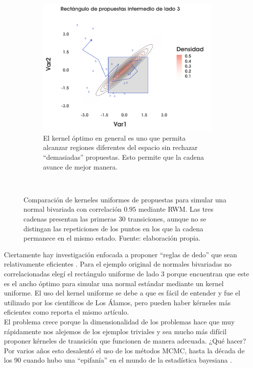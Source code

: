 \begin{figure}
\begin{subfigure}{0.35\textwidth}
    \end{subfigure}
     ~ 
    \begin{subfigure}{0.35\textwidth}
        \includegraphics[width=\textwidth]{Figs/Bayes/Ejemplo_RWM_Compara2}
        \caption{El kernel óptimo en general es uno que permita alcanzar regiones diferentes del espacio sin rechazar ``demasiadas'' propuestas. Esto permite que la cadena avance de mejor manera.}
    \end{subfigure}
    ~
    \caption{Comparación de kerneles uniformes de propuestas para simular una normal bivariada con correlación $0.95$ mediante RWM. Las tres cadenas presentan las primeras $30$ transiciones, aunque no se distingan las repeticiones de los puntos en los que la cadena permanece en el mismo estado. Fuente: elaboración propia.}\label{fig:RWM_Corr}
\end{figure}

Ciertamente hay investigación enfocada a proponer ``reglas de dedo'' que sean relativamente eficientes \parencites{GelmanRobertsGilks96,Geyer05,YangRdz13}. Para el ejemplo original de normales bivariadas no correlacionadas elegí el rectángulo uniforme de lado $3$ porque \textcite{YangRdz13} encuentran que este es el ancho óptimo para simular una normal estándar mediante un kernel uniforme. El uso del kernel uniforme se debe a que es fácil de entender y fue el utilizado por los científicos de Los Álamos, pero pueden haber kérneles más eficientes como reporta el mismo artículo.\\ 

 El problema crece porque la dimensionalidad de los problemas hace que muy rápidamente nos alejemos de los ejemplos triviales y sea mucho más difícil proponer kérneles de transición que funcionen de manera adecuada. ¿Qué hacer? Por varios años esto desalentó el uso de los métodos MCMC, hasta la década de los 90 cuando hubo una ``epifanía'' en el mundo de la estadística bayesiana \parencite{RobertCasella11}. 


